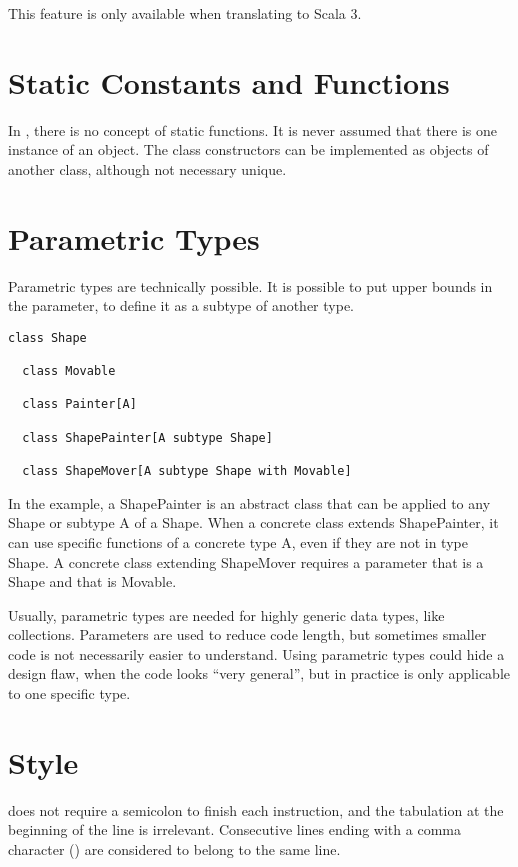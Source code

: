 This feature is only available when translating to Scala 3.


\section{Static Constants and Functions}

In \Soda, there is no concept of static functions.
It is never assumed that there is one instance of an object.
The class constructors can be implemented as objects of another class, although not necessary unique.


\section{Parametric Types}

Parametric types are technically possible.
It is possible to put upper bounds in the parameter, to define it as a subtype of another type.

\begin{lstlisting}[label={lst:exampleUpperBoundParameter}]
  class Shape

  class Movable

  class Painter[A]

  class ShapePainter[A subtype Shape]

  class ShapeMover[A subtype Shape with Movable]
\end{lstlisting}

In the example, a ShapePainter is an abstract class that can be applied to any Shape or subtype A of a Shape.
When a concrete class extends ShapePainter, it can use specific functions of a concrete type A, even if they are not in type Shape.
A concrete class extending ShapeMover requires a parameter that is a Shape and that is Movable.

Usually, parametric types are needed for highly generic data types, like collections.
Parameters are used to reduce code length, but sometimes smaller code is not necessarily easier to understand.
Using parametric types could hide a design flaw, when the code looks ``very general'', but in practice is only applicable to one specific type.


\section{Style}

\Soda does not require a semicolon to finish each instruction, and the tabulation at the beginning of the line is irrelevant.
Consecutive lines ending with a comma character (\srccode{,}) are considered to belong to the same line.

